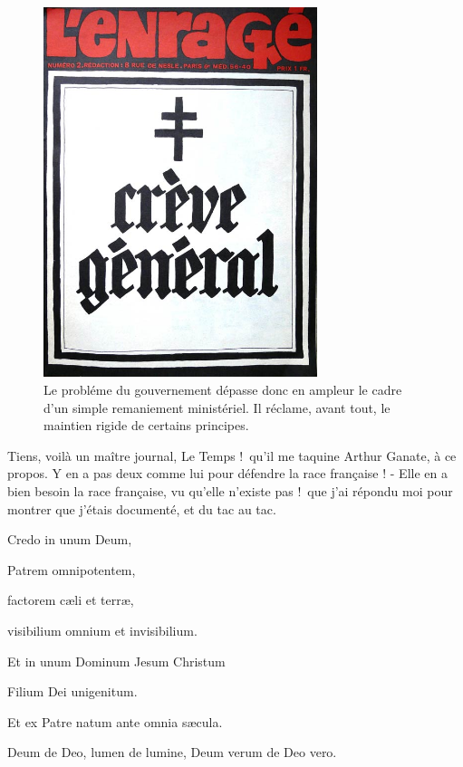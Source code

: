 \documentclass[a4paper,footinbib,final,openany,final,12pt]{book}
\begin{document}
\begin{figure}[!htb]
\begin{center}
\includegraphics[width=8cm]{Fig03}
\caption{Le probl{\'{e}}me du gouvernement d{\'{e}}passe donc en ampleur le cadre d'un simple remaniement minist{\'{e}}riel. Il r{\'{e}}clame, avant tout, le maintien rigide de certains principes.}
\label{Fig3}
\end{center}
\end{figure}

Tiens, voil{\`{a}} un ma{\^{i}}tre journal, Le Temps !\fg~qu'il me taquine Arthur Ganate, {\`{a}} ce propos. \og Y en a pas deux comme lui pour d{\'{e}}fendre la race fran{\c{c}}aise ! - Elle en a bien besoin la race fran{\c{c}}aise, vu qu'elle n'existe pas !\fg~que j'ai r{\'{e}}pondu moi pour montrer que j'{\'{e}}tais document{\'{e}}, et du tac au tac.

Credo in unum Deum,

Patrem omnipotentem,

factorem c{\ae}li et terr{\ae},

visibilium omnium et invisibilium.

Et in unum Dominum Jesum Christum

Filium Dei unigenitum.

Et ex Patre natum ante omnia s{\ae}cula.

Deum de Deo, lumen de lumine, Deum verum de Deo vero.

\end{document}
